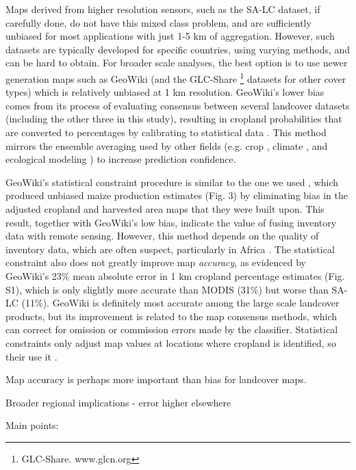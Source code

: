 \documentclass{pnastwo}
\begin{document}
\begin{article}
Maps derived from higher resolution sensors, such as the SA-LC dataset, if carefully done, do not have this mixed class problem, and are sufficiently unbiased for most applications with just 1-5 km of aggregation. However, such datasets are typically developed for specific countries, using varying methods, and can be hard to obtain. For broader scale analyses, the best option is to use newer generation maps such as GeoWiki (and the GLC-Share \footnote{GLC-Share. www.glcn.org} datasets for other cover types) which is relatively unbiased at 1 km resolution. GeoWiki's lower bias comes from its process of evaluating consensus between several landcover datasets (including the other three in this study), resulting in cropland probabilities that are converted to percentages by calibrating to statistical data \cite{fritz_cropland_2011,fritz_mapping_2015}. This method mirrors the ensemble averaging used by other fields (e.g. crop \cite{asseng_uncertainty_2013}, climate \cite{giorgi_calculation_2002}, and ecological modeling \cite{araujo_ensemble_2007}) to increase prediction confidence. 

GeoWiki's statistical constraint procedure is similar to the one we used \cite[following][]{ramankutty_farming_2008}, which produced unbiased maize production estimates (Fig. 3) by eliminating bias in the adjusted cropland and harvested area maps that they were built upon. This result, together with GeoWiki's low bias, indicate the value of fusing inventory data with remote sensing. However, this method depends on the quality of inventory data, which are often suspect, particularly in Africa \cite{carletto_emperor_2013,fao_action_2013}. The statistical constraint also does not greatly improve map \emph{accuracy}, as evidenced by GeoWiki's 23\% mean absolute error in 1 km cropland percentage estimates (Fig. S1), which is only slightly more accurate than MODIS (31\%) but worse than SA-LC (11\%). GeoWiki is definitely most accurate among the large scale landcover products, but its improvement is related to the map consensus methods, which can correct for omission or commission errors made by the classifier. Statistical constraints only adjust map values at locations where cropland is identified, so their use it . 

Map accuracy is perhaps more important than bias for landcover maps.   



 
Broader regional implications - error higher elsewhere

Main points: 



\end{article}
\end{document}
